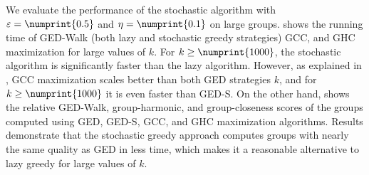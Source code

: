 We evaluate the performance of the stochastic algorithm with $\epsilon =
\numprint{0.5}$ and $\eta = \numprint{0.1}$ on large groups.
 shows the running time of GED-Walk
(both lazy and stochastic greedy strategies) GCC, and GHC maximization for
large values of $k$. For $k \ge \numprint{1000}$, the stochastic algorithm
is significantly faster than the lazy algorithm. However, as explained in
, GCC maximization scales better
than both GED strategies \wrt $k$, and for $k \ge \numprint{1000}$ it is
even faster than GED-S.
%
On the other hand,  shows the
relative GED-Walk, group-harmonic, and group-closeness scores of the groups
computed using GED, GED-S, GCC, and GHC maximization algorithms.
Results demonstrate that the stochastic greedy approach computes groups
with nearly the same quality as GED in less time, which makes it a
reasonable alternative to lazy greedy for large values of $k$.

